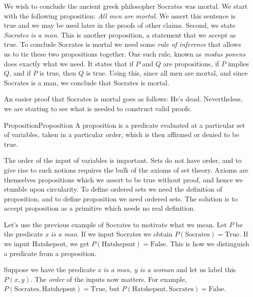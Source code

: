         \begin{example}
            We wish to conclude the ancient greek philosopher
            Socrates was mortal. We start with the following
            proposition: \textit{All men are mortal}. We assert this sentence is
            true and we may be used later in the proofs of other claims. Second,
            we state \textit{Socrates is a man}. This is another proposition, a
            statement that we accept as true. To conclude Socrates is mortal we
            need some \textit{rule of inference} that allows us to tie these two
            propositions together. One such rule, known as
            \textit{modus ponens}%
             does exactly what we need. It states
            that if $P$ and $Q$ are propositions, if $P$ implies $Q$, and if $P$
            is true, then $Q$ is true. Using this, since all men are mortal, and
            since Socrates is a man, we conclude that Socrates is mortal.
        \end{example}
        An easier proof that Socrates is mortal goes as follows: He's dead.
        Nevertheless, we are starting to see what is needed to construct valid
        proofs.
        \begin{fdefinition}{Proposition}{Proposition}
            A \gls{proposition} is a \gls{predicate} evaluated at a particular
            \gls{set} of variables, taken in a particular order, which is then
            affirmed or denied to be true.%
        \end{fdefinition}
        The order of the input of variables is important. Sets do not have
        order, and to give rise to such notions requires the bulk of the axioms
        of set theory. Axioms are themselves propositions which we assert to be
        true without proof, and hence we stumble upon circularity. To define
        ordered sets we need the definition of proposition, and to define
        proposition we need ordered sets. The solution is to accept proposition
        as a primitive which needs no real definition.
        \begin{example}
            Let's use the previous example of Socrates to motivate what we mean.
            Let $P$ be the predicate \textit{x is a man}. If we input Socrates
            we obtain $P(\text{Socrates})=\text{True}$. If we input Hatshepsut,
            we get $P(\text{Hatshepsut})=\text{False}$. This is how we
            distinguish a predicate from a proposition.
        \end{example}
        \begin{example}
            Suppose we have the predicate \textit{x is a man, y is a woman}
            and let us label this $P(x,y)$. The \textit{order} of the inputs now
            matters. For example,
            $P(\text{Socrates},\text{Hatshepsut})=\text{True}$, but
            $P(\text{Hatshepsut},\text{Socrates})=\text{False}$.
        \end{example}
